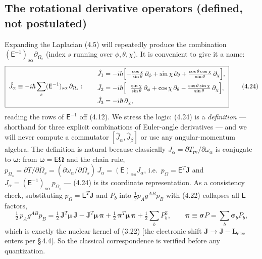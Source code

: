 \subsection{The rotational derivative operators (defined, not postulated)}

Expanding the Laplacian (4.5) will repeatedly produce the combination $(\mathsf E^{-1})_{s\alpha}\partial_{\Omega_s}$ (index $s$ running over $\phi,\theta,\chi$). It is convenient to give it a name:
\begin{equation}
\boxed{\;
\hat J_\alpha\equiv-i\hbar\sum_{s}(\mathsf E^{-1})_{s\alpha}\,\partial_{\Omega_s}:\qquad
\begin{aligned}
\hat J_1&=-i\hbar\Bigl[-\tfrac{\cos\chi}{\sin\theta}\,\partial_\phi+\sin\chi\,\partial_\theta+\tfrac{\cos\theta\cos\chi}{\sin\theta}\,\partial_\chi\Bigr],\\
\hat J_2&=-i\hbar\Bigl[\ \ \tfrac{\sin\chi}{\sin\theta}\,\partial_\phi+\cos\chi\,\partial_\theta-\tfrac{\cos\theta\sin\chi}{\sin\theta}\,\partial_\chi\Bigr],\\
\hat J_3&=-i\hbar\,\partial_\chi ,
\end{aligned}\;}\tag{4.24}
\end{equation}
reading the rows of $\mathsf E^{-1}$ off (4.12). We stress the logic: (4.24) is a \emph{definition} --- shorthand for three explicit combinations of Euler-angle derivatives --- and we will never compute a commutator $[\hat J_\alpha,\hat J_\beta]$ or use any angular-momentum algebra. The definition is natural because classically $J_\alpha=\partial T_{\mathrm{rv}}/\partial\omega_\alpha$ is conjugate to $\boldsymbol\omega$: from $\boldsymbol\omega=\mathsf E\dot{\boldsymbol\Omega}$ and the chain rule, $p_{\Omega_s}=\partial T/\partial\dot\Omega_s=(\partial\omega_\alpha/\partial\dot\Omega_s)\,J_\alpha=(\mathsf E)_{\alpha s}J_\alpha$, i.e.\ $p_\Omega=\mathsf E^{T}\mathbf J$ and $J_\alpha=(\mathsf E^{-1})_{s\alpha}\,p_{\Omega_s}$ --- (4.24) is its coordinate representation. As a consistency check, substituting $p_\Omega=\mathsf E^{T}\mathbf J$ and $P_b$ into $\tfrac12 p_A g^{AB}p_B$ with (4.22) collapses all $\mathsf E$ factors,
\begin{equation}
\tfrac12\,p_Ag^{AB}p_B
=\tfrac12\,\mathbf J^{T}\boldsymbol\mu\,\mathbf J-\mathbf J^{T}\boldsymbol\mu\,\boldsymbol\pi+\tfrac12\,\boldsymbol\pi^{T}\boldsymbol\mu\,\boldsymbol\pi+\tfrac12\sum_bP_b^2,
\qquad \boldsymbol\pi\equiv\boldsymbol\sigma P=\sum_b\boldsymbol\sigma_bP_b , \tag{4.25}
\end{equation}
which is exactly the nuclear kernel of (3.22) [the electronic shift $\mathbf J\to\mathbf J-\mathbf L_{\mathrm{elec}}$ enters per \S\,4.4]. So the classical correspondence is verified before any quantization.


